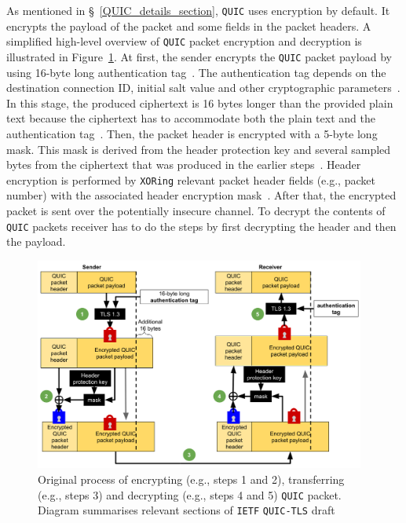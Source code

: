\documentclass[12pt,a4paper]{report}
\begin{document}
As mentioned in \S~\ref{QUIC_details_section}, \texttt{QUIC} uses encryption by default.
It encrypts the payload of the packet and some fields in the packet headers.
A simplified high-level overview of \texttt{QUIC} packet encryption and decryption is illustrated in Figure~\ref{fig:Cryptographic_procedures_of_quic}.
At first, the sender encrypts the \texttt{QUIC} packet payload by using 16-byte long authentication tag~\cite[Section 5]{ietf-quic-tls-32}. 
The authentication tag depends on the destination connection ID, initial salt value and other cryptographic parameters~\cite[Section 5]{ietf-quic-tls-32}.
In this stage, the produced ciphertext is 16 bytes longer than the provided plain text because the ciphertext has to accommodate both the plain text and the authentication tag~\cite[Section 5.3]{ietf-quic-tls-32}.
Then, the packet header is encrypted with a 5-byte long mask.
This mask is derived from the header protection key and several sampled bytes from the ciphertext that was produced in the earlier steps~\cite[Section 5]{ietf-quic-tls-32}. 
Header encryption is performed by \texttt{XORing} relevant packet header fields (e.g., packet number) with the associated header encryption mask~\cite[Section 5]{ietf-quic-tls-32}.
After that, the encrypted packet is sent over the potentially insecure channel.
To decrypt the contents of \texttt{QUIC} packets receiver has to do the steps by first decrypting the header and then the payload.

    \begin{figure}[H]
    \centering
    \includegraphics[width=0.97\textwidth]{figs/Cryptographic_procedures_of_quic.png}
    \caption[Original process of encrypting, transferring and decrypting \texttt{QUIC} packet]{Original process of encrypting (e.g., steps 1 and 2), transferring  (e.g., steps 3) and decrypting (e.g., steps 4 and 5) \texttt{QUIC} packet. Diagram summarises relevant sections of \texttt{IETF} \texttt{QUIC-TLS} draft~\cite[Section 5]{ietf-quic-tls-32}}
    \label{fig:Cryptographic_procedures_of_quic}
    \end{figure}
\end{document}
